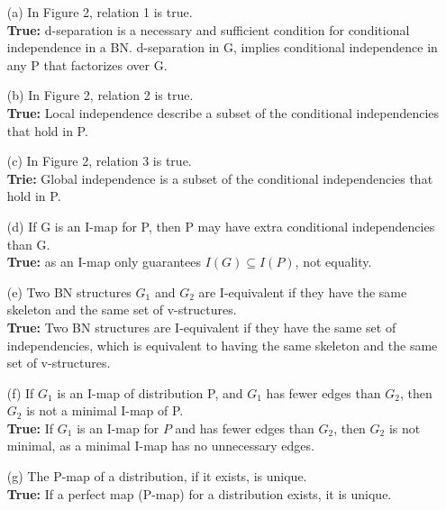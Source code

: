 \documentclass[a3paper,12pt]{extarticle} %
\begin{document}
\begin{enumerate}
    \begin{enumerate}
        \item[(a)] In Figure 2, relation 1 is true.
        \\ \textbf{True:} d-separation is a necessary and sufficient condition for conditional independence in a BN. d-separation in G, implies conditional independence in any P that factorizes over G.
        \item[(b)] In Figure 2, relation 2 is true.
        \\ \textbf{True:}  Local independence describe a subset of the conditional independencies that hold in P. 
        \item[(c)] In Figure 2, relation 3 is true.
        \\ \textbf{Trie:} Global independence is a subset of the conditional independencies that hold in P.
        \item[(d)] If G is an I-map for P, then P may have extra conditional independencies than G.
        \\ \textbf{True:} as an I-map only guarantees \(I(G) \subseteq I(P)\), not equality.
        \item[(e)] Two BN structures $G_1$ and $G_2$ are I-equivalent if they have the same skeleton and the same set of v-structures.
        \\ \textbf{True:} Two BN structures are I-equivalent if they have the same set of independencies, which is equivalent to having the same skeleton and the same set of v-structures.
        \item[(f)] If $G_1$ is an I-map of distribution P, and $G_1$ has fewer edges than $G_2$, then $G_2$ is not a minimal I-map of P.
        \\ \textbf{True:} If \(G_1\) is an I-map for \(P\) and has fewer edges than \(G_2\), then \(G_2\) is not minimal, as a minimal I-map has no unnecessary edges.    
        \item[(g)] The P-map of a distribution, if it exists, is unique.
        \\ \textbf{True:} If a perfect map (P-map) for a distribution exists, it is unique.
    \end{enumerate}
\end{enumerate}
\newpage
\end{document}
